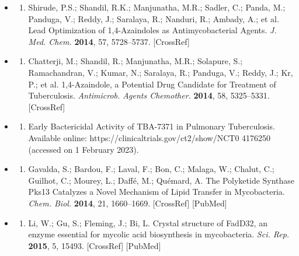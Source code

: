 \documentclass{article}
\begin{document}
\begin{itemize}
\begin{enumerate}
\end{enumerate}

\item \begin{enumerate}
\item 
Shirude, P.S.; Shandil, R.K.; Manjunatha, M.R.; Sadler, C.; Panda, M.; Panduga, V.; Reddy, J.; Saralaya, R.; Nanduri, R.; Ambady, A.; et al. Lead Optimization of 1,4-Azaindoles as Antimycobacterial Agents. \textit{J. Med. Chem.} \textbf{2014}, 57, 5728–5737. [CrossRef]

\end{enumerate}

\item \begin{enumerate}
\item 
Chatterji, M.; Shandil, R.; Manjunatha, M.R.; Solapure, S.; Ramachandran, V.; Kumar, N.; Saralaya, R.; Panduga, V.; Reddy, J.; Kr, P.; et al. 1,4-Azaindole, a Potential Drug Candidate for Treatment of Tuberculosis. \textit{Antimicrob. Agents Chemother.} \textbf{2014}, 58, 5325–5331. [CrossRef]

\end{enumerate}

\item \begin{enumerate}
\item 
Early Bactericidal Activity of TBA-7371 in Pulmonary Tuberculosis. Available online: https://clinicaltrials.gov/ct2/show/NCT0 4176250 (accessed on 1 February 2023).

\end{enumerate}

\item \begin{enumerate}
\item 
Gavalda, S.; Bardou, F.; Laval, F.; Bon, C.; Malaga, W.; Chalut, C.; Guilhot, C.; Mourey, L.; Daffé, M.; Quémard, A. The Polyketide Synthase Pks13 Catalyzes a Novel Mechanism of Lipid Transfer in Mycobacteria. \textit{Chem. Biol.} \textbf{2014}, 21, 1660–1669. [CrossRef] [PubMed]

\end{enumerate}

\item \begin{enumerate}
\item 
Li, W.; Gu, S.; Fleming, J.; Bi, L. Crystal structure of FadD32, an enzyme essential for mycolic acid biosynthesis in mycobacteria. \textit{Sci. Rep.} \textbf{2015}, 5, 15493. [CrossRef] [PubMed]


\end{enumerate}
\end{itemize}
\end{document}

